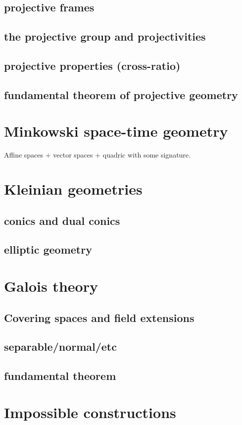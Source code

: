 \documentclass[a4,12pt]{amsbook}
\begin{document}
\section{projective frames}
\section{the projective group and projectivities}
\section{projective properties (cross-ratio)}
\section{fundamental theorem of projective geometry}
\chapter{Minkowski space-time geometry}
Affine spaces + vector spaces + quadric with some signature.
\chapter{Kleinian geometries}
\section{conics and dual conics}
\section{elliptic geometry}
\chapter{Galois theory}
\section{Covering spaces and field extensions}
\section{separable/normal/etc}
\section{fundamental theorem}
\chapter{Impossible constructions}
\end{document}
